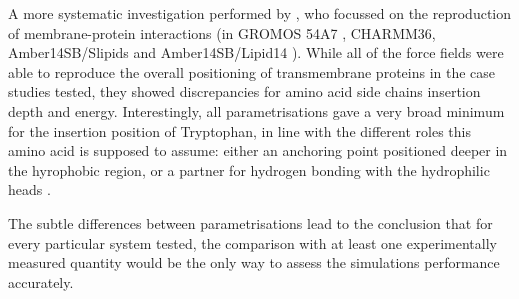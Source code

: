A more systematic investigation performed by \citet{Sandoval-Perez2017}, who focussed on the reproduction of membrane-protein interactions (in GROMOS 54A7 \citep{Schmid2011}, CHARMM36, Amber14SB/Slipids \citep{Jambeck2012} and Amber14SB/Lipid14 \citep{Dickson2014}).
%
While all of the force fields were able to reproduce the overall positioning of transmembrane proteins in the case studies tested, they showed discrepancies for amino acid side chains insertion depth and energy.
%
Interestingly, all parametrisations gave a very broad minimum for the insertion position of Tryptophan, in line with the different roles this amino acid is supposed to assume: either an anchoring point positioned deeper in the hyrophobic region, or a partner for hydrogen bonding with the hydrophilic heads \citep{Chan2006}.

The subtle differences between parametrisations lead to the conclusion that for every particular system tested, the comparison with at least one experimentally measured quantity would be the only way to assess the simulations performance accurately.

